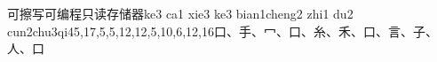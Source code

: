 \begin{EntryWithPhonetic*}{可擦写可编程只读存储器}{ke3 ca1 xie3 ke3 bian1cheng2 zhi1 du2 cun2chu3qi4}{5,17,5,5,12,12,5,10,6,12,16}{⼝、⼿、⼍、⼝、⽷、⽲、⼝、⾔、⼦、⼈、⼝}
\end{EntryWithPhonetic*}
